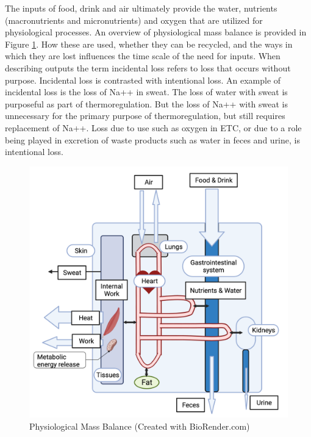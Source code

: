 The inputs of food, drink and air ultimately provide the water, nutrients (macronutrients and micronutrients) and oxygen that are utilized for physiological processes. An overview of physiological mass balance is provided in Figure \ref{fig:mass_balance}. How these are used, whether they can be recycled, and the ways in which they are lost influences the time scale of the need for inputs. When describing outputs the term incidental loss refers to loss that occurs without purpose. Incidental loss is contrasted with intentional loss. An example of incidental loss is the loss of Na++ in sweat. The loss of water with sweat is purposeful as part of thermoregulation. But the loss of Na++ with sweat is unnecessary for the primary purpose of thermoregulation, but still requires replacement of Na++. Loss due to use such as oxygen in ETC, or due to a role being played in excretion of waste products such as water in feces and urine, is intentional loss. 

\begin{figure}[!h]
    \centering
    \includegraphics[width=1\linewidth]{./figure/mass_balance.png}
    \caption{Physiological Mass Balance \footnotesize{(Created with BioRender.com)}}
    \label{fig:mass_balance}
\end{figure}

